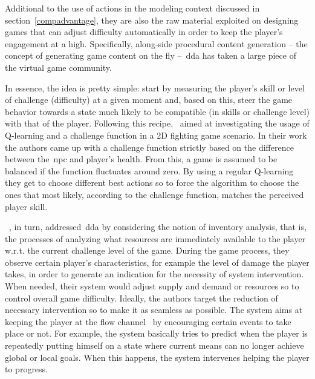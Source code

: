 Additional to the use of actions in the modeling context discussed in section~\ref{compadvantage}, they are also the raw material exploited on designing games that can adjust difficulty automatically in order to keep the player's engagement at a high. Specifically, along-side procedural content generation -- the concept of generating game content on the fly --~\gls{dda} %
has taken a large piece of the virtual game community.

In essence, the idea is pretty simple: start by measuring the player's skill or level of challenge (difficulty) at a given moment and, based on this, steer the game behavior towards a state much likely to be compatible (in skills or challenge level) with that of the player. Following this recipe,~\cite{andrade_online_2004, andrade_extending_2005} aimed at investigating the usage of Q-learning and a challenge function in a 2D fighting game scenario. In their work the authors came up with a challenge function strictly based on the difference between the~\gls{npc} and player's health. From this, a game is assumed to be balanced if the function fluctuates around zero. By using a regular Q-learning they get to choose different best actions so to force the algorithm to choose the ones that most likely, according to the challenge function, matches the perceived player skill. 

~\cite{hunicke_ai_2004}, in turn, addressed~\gls{dda} by considering the notion of inventory analysis, that is, the processes of analyzing what resources are immediately available to the player w.r.t. the current challenge level of the game. During the game process, they observe certain player's characteristics, for example the level of damage the player takes, in order to generate an indication for the necessity of system intervention. When needed, their system would adjust supply and demand or resources so to control overall game difficulty. Ideally, the authors target the reduction of necessary intervention so to make it as seamless as possible. The system aims at keeping the player at the flow channel~\citep{csikszentmihalyi_flow:_1991} by encouraging certain events to take place or not. For example, the system basically tries to predict when the player is repeatedly putting himself on a state where current means can no longer achieve global or local goals.
When this happens, the system intervenes helping the player to progress.

